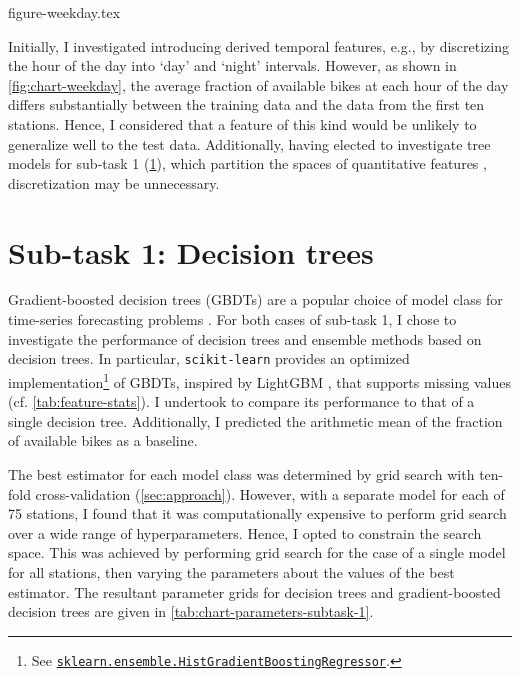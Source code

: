 \documentclass[11pt]{extarticle}
\newcommand{\sklearn}[2]{\href{https://scikit-learn.org/stable/modules/generated/sklearn.#1.#2.html}{\lstinline|sklearn.#1.#2|}}
\begin{document}
{figure-weekday.tex}

Initially, I investigated introducing derived temporal features, e.g., by discretizing
the hour of the day into `day' and `night' intervals.
However, as shown in \cref{fig:chart-weekday}, the average fraction of available bikes
at each hour of the day differs substantially between the training data and the data
from the first ten stations.
Hence, I considered that a feature of this kind would be unlikely to generalize well to
the test data.
Additionally, having elected to investigate tree models for sub-task 1
(\cref{sec:results-subtask-1}), which partition the spaces of quantitative features
\parencite[155]{Flach2012}, discretization may be unnecessary.

\section{Sub-task 1: Decision trees}
\label{sec:results-subtask-1}

Gradient-boosted decision trees (GBDTs) are a popular choice of model class for
time-series forecasting problems \parencite{Bojer2021}.
For both cases of sub-task 1, I chose to investigate the performance of decision trees
and ensemble methods based on decision trees.
In particular, \texttt{scikit-learn} provides an optimized implementation\footnote{See
  \sklearn{ensemble}{HistGradientBoostingRegressor}.
} of GBDTs,
inspired by LightGBM \parencite{Ke2017}, that supports missing values (cf. \cref{tab:feature-stats}).
I undertook to compare its performance to that of a single decision tree.
Additionally, I predicted the arithmetic mean of the fraction of available bikes as a
baseline.

The best estimator for each model class was determined by grid search with ten-fold
cross-validation (\cref{sec:approach}).
However, with a separate model for each of 75 stations, I found that it was
computationally expensive to perform grid search over a wide range of hyperparameters.
Hence, I opted to constrain the search space.
This was achieved by performing grid search for the case of a single model for all
stations, then varying the parameters about the values of the best estimator.
The resultant parameter grids for decision trees and gradient-boosted decision trees
are given in \cref{tab:chart-parameters-subtask-1}.
\end{document}
